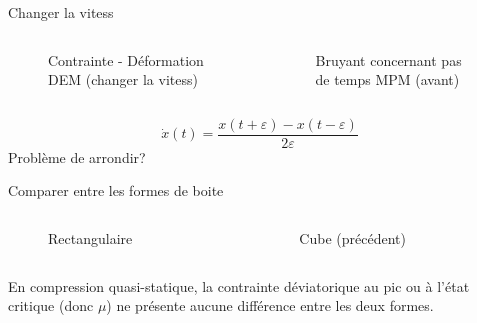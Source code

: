 \documentclass[10pt]{beamer}
\begin{document}
\begin{frame}{Changer la vitess}
    \begin{columns}
        \begin{column}{0.5\textwidth}
            \begin{figure}[h]
                \centering
                \scalebox{0.5}{}
                \caption{Contrainte - Déformation DEM (changer la vitess)}
            \end{figure}
        \end{column}
        \begin{column}{0.5\textwidth}
            \begin{figure}[h]
                \centering
                \scalebox{0.5}{}
                \caption{Bruyant concernant pas de temps MPM (avant)}
            \end{figure}
        \end{column}
    \end{columns}
    \[
        \dot{x}(t) = \frac{x(t+\varepsilon) - x(t-\varepsilon)}{2\varepsilon}
    \]
    Problème de arrondir?
\end{frame}

\begin{frame}{Comparer entre les formes de boite}
    \begin{columns}
        \begin{column}{0.5\textwidth}
            \begin{figure}[h]
                \centering
                \scalebox{0.5}{}
                \caption{Rectangulaire}
            \end{figure}
        \end{column}
        \begin{column}{0.5\textwidth}
            \begin{figure}[h]
                \centering
                \scalebox{0.5}{}
                \caption{Cube (précédent)}
            \end{figure}
        \end{column}
    \end{columns}
    En compression quasi-statique, la contrainte déviatorique au pic ou à l’état critique (donc  $\mu$) ne présente aucune différence entre les deux formes.
\end{frame}
\end{document}
